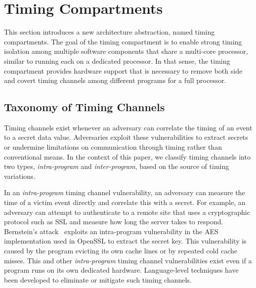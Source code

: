 \section{Timing Compartments}

This section introduces a new architecture abstraction, named timing 
compartments.
The goal of the timing compartment is to enable strong timing isolation
among multiple software components that share a multi-core processor,
similar to running each on a dedicated processor.
In that sense, the timing compartment provides hardware support that is 
necessary to remove both side and covert timing channels among
different programs for a full processor.


\subsection{Taxonomy of Timing Channels}

Timing channels exist whenever an adversary can correlate the timing of an event
to a secret data value. Adversaries exploit these vulnerabilities to extract 
secrets or undermine limitations on communication through timing rather than 
conventional means. In the context of this paper, we classify timing channels
into two types, {\em intra-program} and {\em inter-program}, 
based on the source of timing variations.

In an {\em intra-program} timing channel vulnerability, an adversary can measure 
the time of a victim event directly and correlate this with a secret. For 
example, an adversary can attempt to authenticate to a remote site that uses a 
cryptographic protocol such as SSL and measure how long the server takes to 
respond. Bernstein's attack~\cite{bernstein} exploits an intra-program 
vulnerability in the AES implementation used in OpenSSL to extract the secret 
key. This vulnerability is caused by the program evicting its 
own cache lines or by repeated cold cache misses.
This and other {\em intra-program} timing channel vulnerabilities
exist even if a program runs on its own dedicated hardware.
Language-level techniques have been developed to
eliminate \cite{timesens} or mitigate \cite{mitigation1,mitigation2,mitigation3} 
such timing channels.

